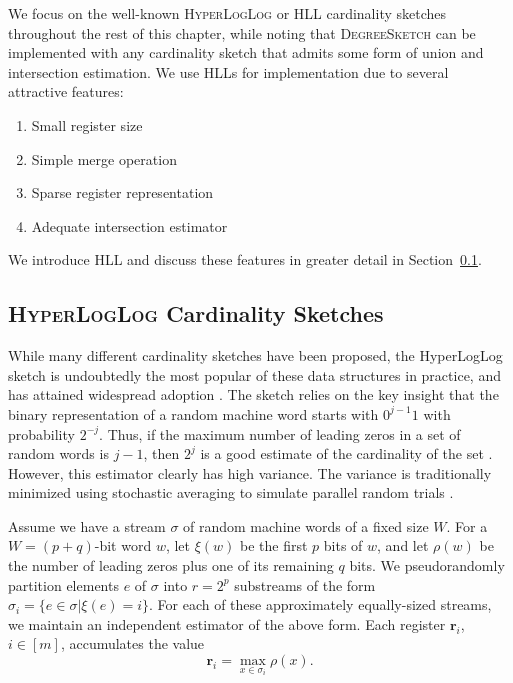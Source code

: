 \documentclass{report}
\newcommand{\algoname}[1]{\textnormal{\textsc{#1}}}
\begin{document}
We focus on the well-known \algoname{HyperLogLog} or \algoname{HLL} cardinality sketches throughout the rest of this chapter, while noting that \algoname{DegreeSketch} can be implemented with any cardinality sketch that admits some form of union and intersection estimation.
We use \algoname{HLL}s for implementation due to several attractive features:
\begin{enumerate}
	\item Small register size
	\item Simple merge operation
	\item Sparse register representation
	\item Adequate intersection estimator
\end{enumerate}

We introduce \algoname{HLL} and discuss these features in greater detail in Section~\ref{DS:sec:hll}.

\subsection{\algoname{HyperLogLog} Cardinality Sketches}
 \label{DS:sec:hll}

While many different cardinality sketches have been proposed, the HyperLogLog sketch is undoubtedly the most popular of these data structures in practice, and has attained widespread adoption \cite{flajolet2007hyperloglog}.
The sketch relies on the key insight that the binary representation of a random machine word  starts with $0^{j-1} 1$ with probability $2^{-j}$. 
Thus, if the maximum number of leading zeros in a set of random words is $j-1$, then $2^j$ is a good estimate of the cardinality of the set \cite{flajolet1985probabilistic}.
However, this estimator clearly has high variance. 
The variance is traditionally minimized using stochastic averaging to simulate parallel random trials \cite{flajolet1985probabilistic}.

Assume we have a stream $\sigma$ of random machine words of a fixed size $W$.
For a $W=(p + q)$-bit word $w$, let $\xi(w)$ be the first $p$ bits of $w$, and let $\rho(w)$ be the number of leading zeros plus one of its remaining $q$ bits.
We pseudorandomly partition elements $e$ of $\sigma$ into $r = 2^p$ substreams of the form $\sigma_i = \{ e \in \sigma | \xi(e) = i \}$.
For each of these approximately equally-sized streams, we maintain an independent estimator of the above form.
Each register $\mathbf{r}_i$, $i \in [m]$, accumulates the value
%
\begin{equation} \label{eq:register}
\mathbf{r}_i = \max\limits_{x \in \sigma_i} \rho(x).
\end{equation}
%
\end{document}
